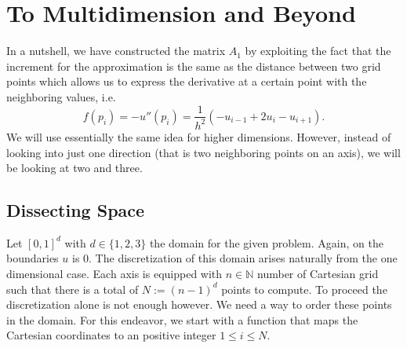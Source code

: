 \section{To Multidimension and Beyond}
In a nutshell, we have constructed the matrix \(A_1\) by exploiting the fact that the increment for the approximation is the same as the distance between two grid points which allows us to express the derivative at a certain point with the neighboring values, i.e.
\[
f(p_i) = -u''(p_i) = \frac{1}{h^2} (-u_{i - 1} + 2 u_i - u_{i + 1}) \text{.}
\]
We will use essentially the same idea for higher dimensions. However, instead of looking into just one direction (that is two neighboring points on an axis), we will be looking at two and three.
\subsection{Dissecting Space}


Let \([0,1]^{d}\) with \(d \in \{1, 2, 3\}\) the domain for the given problem. Again, on the boundaries \(u\) is \(0\). The discretization of this domain arises naturally from the one dimensional case. Each axis is equipped with \(n \in \mathbb{N}\) number of Cartesian grid such that there is a total of \( N := (n-1)^d\) points to compute. To proceed the discretization alone is not enough however. We need a way to order these points in the domain. For this endeavor, we start with a function that maps the Cartesian coordinates to an positive integer \(1 \leq i \leq N\).

